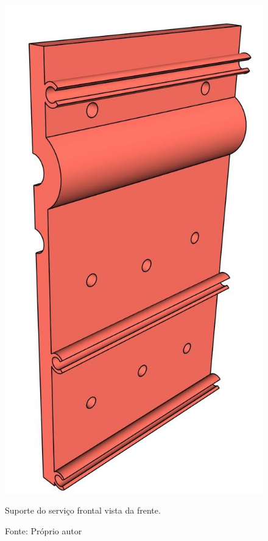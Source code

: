 \begin{figure}[H]
\centering
\includegraphics[scale = 0.4]{figuras/ressuporteservicofrontalf}
\caption{Suporte do serviço frontal vista da frente.}
\caption*{Fonte: Próprio autor}
\label{fig:ressuporteservicofrontalf}
\end{figure}
        
